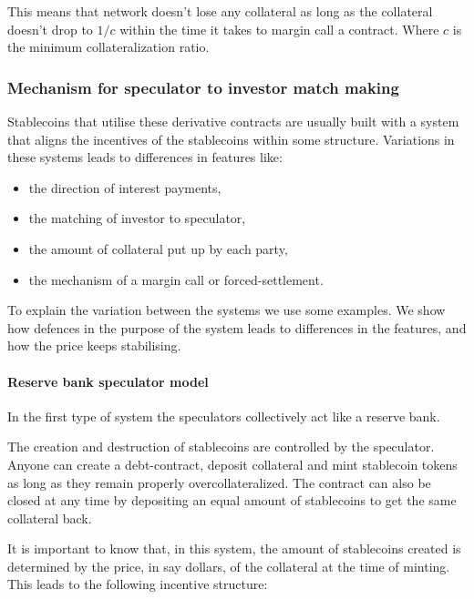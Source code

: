 \documentclass[english,]{IEEEtran}
\providecommand{\tightlist}{%
  \setlength{\itemsep}{0pt}\setlength{\parskip}{0pt}}
\let\oldparagraph\paragraph
\renewcommand{\paragraph}[1]{\oldparagraph{#1}\mbox{}}
\begin{document}
This means that network doesn't lose any collateral as long as the
collateral doesn't drop to \(1/c\) within the time it takes to margin
call a contract. Where \(c\) is the minimum collateralization ratio.

\subsubsection{Mechanism for speculator to investor match
making}\label{mechanism-for-speculator-to-investor-match-making}

Stablecoins that utilise these derivative contracts are usually built
with a system that aligns the incentives of the stablecoins within some
structure. Variations in these systems leads to differences in features
like:

\begin{itemize}
\tightlist
\item
  the direction of interest payments,
\item
  the matching of investor to speculator,
\item
  the amount of collateral put up by each party,
\item
  the mechanism of a margin call or forced-settlement.
\end{itemize}

To explain the variation between the systems we use some examples. We
show how defences in the purpose of the system leads to differences in
the features, and how the price keeps stabilising.

\paragraph{Reserve bank speculator
model}\label{reserve-bank-speculator-model}

In the first type of system the speculators collectively act like a
reserve bank.

The creation and destruction of stablecoins are controlled by the
speculator. Anyone can create a debt-contract, deposit collateral and
mint stablecoin tokens as long as they remain properly
overcollateralized. The contract can also be closed at any time by
depositing an equal amount of stablecoins to get the same collateral
back.

It is important to know that, in this system, the amount of stablecoins
created is determined by the price, in say dollars, of the collateral at
the time of minting. This leads to the following incentive structure:
\end{document}
